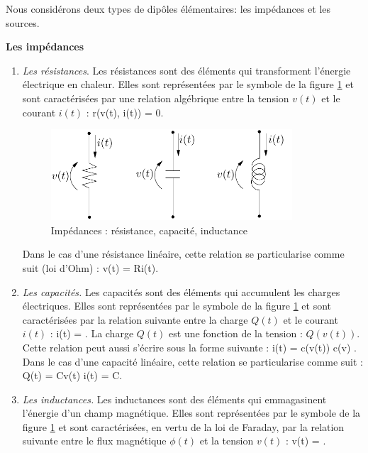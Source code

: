 Nous considérons deux types de dip{ô}les élémentaires:
les impédances et les sources.
\begin{description}
\item{\bf Les impédances}
\begin{enumerate}
\item{\em Les résistances}. Les résistances sont des éléments qui transforment l'énergie électrique en chaleur. Elles sont représentées par
le symbole de la figure \ref{fig:impedances} et sont caractérisées
par une relation algébrique entre la tension $v(t)$ et le courant
$i(t)$ :
\eqnn
r(v(t), i(t)) = 0.
\eeqnn
\begin{figure}[t]
\begin{center}
\includegraphics[width=9cm]{impedances}
\caption{Impédances : résistance, capacité, inductance}
\label{fig:impedances}
\end{center}
\end{figure}
Dans le cas d'une résistance linéaire, cette relation se
particularise comme suit (loi d'Ohm) :
\eqnn
v(t) = Ri(t).
\eeqnn
\item {\em Les capacités.} Les capacités sont des éléments qui accumulent les charges électriques. Elles sont représentées par le
symbole de la figure \ref{fig:impedances} et sont caractérisées par la
relation suivante entre la charge $Q(t)$ et le courant $i(t)$ :
\eqnn
i(t) = .
\eeqnn
La charge $Q(t)$ est une fonction de la tension : $Q(v(t))$.  Cette relation peut aussi
s'écrire sous la forme suivante :
\eqnn
i(t) = c(v(t))  \;\;
 \;\; c(v) \triangleq  {}.
\eeqnn
Dans le cas d'une capacité linéaire, cette relation se
particu\-larise comme suit :
\eqnn
Q(t) = Cv(t) \;\;  \;\; i(t) = C.
\eeqnn
\item{\em Les inductances.}  Les inductances sont des éléments qui emmagasinent l'énergie d'un champ magnétique. Elles sont représentées par le
symbole de la figure \ref{fig:impedances} et sont caractérisées, en vertu de
la loi de Faraday, par la relation suivante entre le flux magnétique $\phi(t)$ et la tension
$v(t)$ :
\eqn
v(t) = . \label{definduc}

\end{enumerate}
\end{description}

